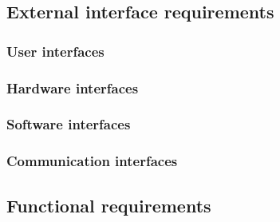 
  \subsection{External interface requirements}
    \subsubsection{User interfaces}
    \label{sec:userinterfaces}
    \subsubsection{Hardware interfaces}
    \subsubsection{Software interfaces}
    \subsubsection{Communication interfaces}

  \subsection{Functional requirements}

